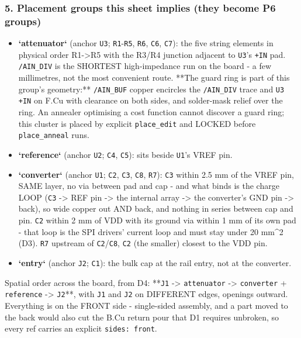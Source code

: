 \documentclass[11pt,a4paper]{article}
\begin{document}
\subsubsection*{5. Placement groups this sheet implies (they become P6 groups)}
\begin{itemize}
\item \textbf{`attenuator`} (anchor \texttt{U3}; \texttt{R1}-\texttt{R5}, \texttt{R6}, \texttt{C6}, \texttt{C7}): the five string
elements in physical order R1-\textgreater{}R5 with the R3/R4 junction adjacent to \texttt{U3}'s
\texttt{+IN} pad. \texttt{/AIN\_DIV} is the SHORTEST high-impedance run on the board - a few
millimetres, not the most convenient route. {*}{*}The guard ring is part of this
group's geometry:{*}{*} \texttt{/AIN\_BUF} copper encircles the \texttt{/AIN\_DIV} trace and
\texttt{U3 +IN} on F.Cu with clearance on both sides, and solder-mask relief over
the ring. An annealer optimising a cost function cannot discover a guard
ring; this cluster is placed by explicit \texttt{place\_edit} and LOCKED before
\texttt{place\_anneal} runs.
\item \textbf{`reference`} (anchor \texttt{U2}; \texttt{C4}, \texttt{C5}): sits beside \texttt{U1}'s VREF pin.
\item \textbf{`converter`} (anchor \texttt{U1}; \texttt{C2}, \texttt{C3}, \texttt{C8}, \texttt{R7}): \texttt{C3} within 2.5 mm of
the VREF pin, SAME layer, no via between pad and cap - and what binds is the
charge LOOP (\texttt{C3} -\textgreater{} REF pin -\textgreater{} the internal array -\textgreater{} the converter's GND pin
-\textgreater{} back), so wide copper out AND back, and nothing in series between cap and
pin. \texttt{C2} within 2 mm of VDD with its ground via within 1 mm of its own pad -
that loop is the SPI drivers' current loop and must stay under 20 mm\textasciicircum{}2 (D3).
\texttt{R7} upstream of \texttt{C2}/\texttt{C8}, \texttt{C2} (the smaller) closest to the VDD pin.
\item \textbf{`entry`} (anchor \texttt{J2}; \texttt{C1}): the bulk cap at the rail entry, not at the
converter.
\end{itemize}
Spatial order across the board, from D4: {*}{*}\texttt{J1} -\textgreater{} \texttt{attenuator} -\textgreater{} \texttt{converter} + \texttt{reference} -\textgreater{} \texttt{J2}{*}{*}, with \texttt{J1} and \texttt{J2} on DIFFERENT edges, openings outward. Everything is on the FRONT side - single-sided assembly, and a part moved to the back would also cut the B.Cu return pour that D1 requires unbroken, so every ref carries an explicit \texttt{sides: front}.
\end{document}

